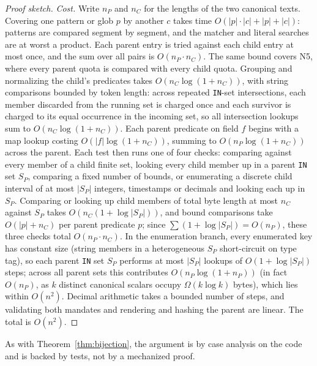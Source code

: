\documentclass[10pt,twocolumn]{article}
\theoremstyle{plain}
\theoremstyle{definition}
\begin{document}
\begin{proof}[Proof sketch]
\emph{Cost.} Write $n_P$ and $n_C$ for the lengths of the two canonical texts. Covering one pattern or glob $p$ by another $c$ takes time $O(|p| \cdot |c| + |p| + |c|)$: patterns are compared segment by segment, and the matcher and literal searches are at worst a product. Each parent entry is tried against each child entry at most once, and the sum over all pairs is $O(n_P \cdot n_C)$. The same bound covers N5, where every parent quota is compared with every child quota. Grouping and normalizing the child's predicates takes $O(n_C \log(1 + n_C))$, with string comparisons bounded by token length: across repeated \texttt{IN}-set intersections, each member discarded from the running set is charged once and each survivor is charged to its equal occurrence in the incoming set, so all intersection lookups sum to $O(n_C \log(1 + n_C))$. Each parent predicate on field $f$ begins with a map lookup costing $O(|f| \log(1 + n_C))$, summing to $O(n_P \log(1 + n_C))$ across the parent. Each test then runs one of four checks: comparing against every member of a child finite set, looking every child member up in a parent \texttt{IN} set $S_P$, comparing a fixed number of bounds, or enumerating a discrete child interval of at most $|S_P|$ integers, timestamps or decimals and looking each up in $S_P$. Comparing or looking up child members of total byte length at most $n_C$ against $S_P$ takes $O(n_C (1 + \log |S_P|))$, and bound comparisons take $O(|p| + n_C)$ per parent predicate $p$; since $\sum (1 + \log |S_P|) = O(n_P)$, these three checks total $O(n_P \cdot n_C)$. In the enumeration branch, every enumerated key has constant size (string members in a heterogeneous $S_P$ short-circuit on type tag), so each parent \texttt{IN} set $S_P$ performs at most $|S_P|$ lookups of $O(1 + \log |S_P|)$ steps; across all parent sets this contributes $O(n_P \log(1 + n_P))$ (in fact $O(n_P)$, as $k$ distinct canonical scalars occupy $\Omega(k \log k)$ bytes), which lies within $O(n^2)$. Decimal arithmetic takes a bounded number of steps, and validating both mandates and rendering and hashing the parent are linear. The total is $O(n^2)$.
\end{proof}

As with Theorem~\ref{thm:bijection}, the argument is by case analysis on the code and is backed by tests, not by a mechanized proof.
\end{document}
